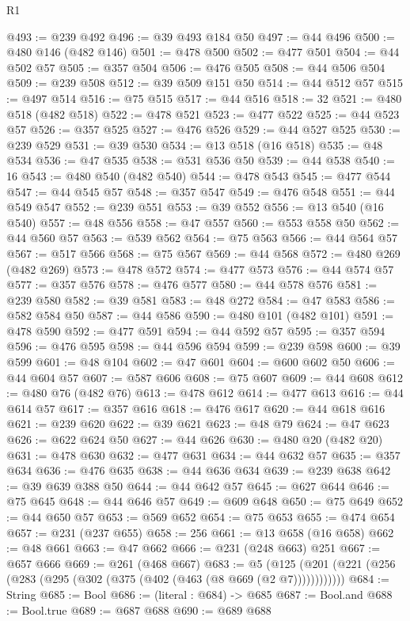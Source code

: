 \begin{lexlean}{R1}
\begin{coremodule}
{{{{{{{{{{{{{{{{{{{{{{{@493 := @239 @492
@496 := @39 @493 @184 @50
@497 := @44 @496
@500 := @480 @146 (@482 @146)
@501 := @478 @500
@502 := @477 @501
@504 := @44 @502 @57
@505 := @357 @504
@506 := @476 @505
@508 := @44 @506 @504
@509 := @239 @508
@512 := @39 @509 @151 @50
@514 := @44 @512 @57
@515 := @497 @514
@516 := @75 @515
@517 := @44 @516
@518 := 32
@521 := @480 @518 (@482 @518)
@522 := @478 @521
@523 := @477 @522
@525 := @44 @523 @57
@526 := @357 @525
@527 := @476 @526
@529 := @44 @527 @525
@530 := @239 @529
@531 := @39 @530
@534 := @13 @518 (@16 @518)
@535 := @48 @534
@536 := @47 @535
@538 := @531 @536 @50
@539 := @44 @538
@540 := 16
@543 := @480 @540 (@482 @540)
@544 := @478 @543
@545 := @477 @544
@547 := @44 @545 @57
@548 := @357 @547
@549 := @476 @548
@551 := @44 @549 @547
@552 := @239 @551
@553 := @39 @552
@556 := @13 @540 (@16 @540)
@557 := @48 @556
@558 := @47 @557
@560 := @553 @558 @50
@562 := @44 @560 @57
@563 := @539 @562
@564 := @75 @563
@566 := @44 @564 @57
@567 := @517 @566
@568 := @75 @567
@569 := @44 @568
@572 := @480 @269 (@482 @269)
@573 := @478 @572
@574 := @477 @573
@576 := @44 @574 @57
@577 := @357 @576
@578 := @476 @577
@580 := @44 @578 @576
@581 := @239 @580
@582 := @39 @581
@583 := @48 @272
@584 := @47 @583
@586 := @582 @584 @50
@587 := @44 @586
@590 := @480 @101 (@482 @101)
@591 := @478 @590
@592 := @477 @591
@594 := @44 @592 @57
@595 := @357 @594
@596 := @476 @595
@598 := @44 @596 @594
@599 := @239 @598
@600 := @39 @599
@601 := @48 @104
@602 := @47 @601
@604 := @600 @602 @50
@606 := @44 @604 @57
@607 := @587 @606
@608 := @75 @607
@609 := @44 @608
@612 := @480 @76 (@482 @76)
@613 := @478 @612
@614 := @477 @613
@616 := @44 @614 @57
@617 := @357 @616
@618 := @476 @617
@620 := @44 @618 @616
@621 := @239 @620
@622 := @39 @621
@623 := @48 @79
@624 := @47 @623
@626 := @622 @624 @50
@627 := @44 @626
@630 := @480 @20 (@482 @20)
@631 := @478 @630
@632 := @477 @631
@634 := @44 @632 @57
@635 := @357 @634
@636 := @476 @635
@638 := @44 @636 @634
@639 := @239 @638
@642 := @39 @639 @388 @50
@644 := @44 @642 @57
@645 := @627 @644
@646 := @75 @645
@648 := @44 @646 @57
@649 := @609 @648
@650 := @75 @649
@652 := @44 @650 @57
@653 := @569 @652
@654 := @75 @653
@655 := @474 @654
@657 := @231 (@237 @655)
@658 := 256
@661 := @13 @658 (@16 @658)
@662 := @48 @661
@663 := @47 @662
@666 := @231 (@248 @663) @251
@667 := @657 @666
@669 := @261 (@468 @667)
@683 := @5 (@125 (@201 (@221 (@256 (@283 (@295 (@302 (@375 (@402 (@463 (@8 @669 (@2 @7))))))))))))
@684 := String
@685 := Bool
@686 := (literal : @684) -> @685
@687 := Bool.and
@688 := Bool.true
@689 := @687 @688
@690 := @689 @688
}}}}}}}}}}}}}}}}}}}}}}}
\end{coremodule}
\end{lexlean}
